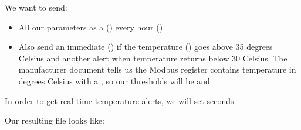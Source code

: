 \documentclass[letterpaper,10pt,english]{sphinxmanual}
\begin{document}
We want to send:
\begin{itemize}
\item {} 
All our parameters as a  () every hour ()

\item {} 
Also send an immediate  () if the temperature () goes above 35 degrees Celsius and another alert when temperature returns below 30 Celsius.
The manufacturer document tells us the Modbus register contains temperature in degrees Celsius with a , so our thresholds will be  and 

\end{itemize}

In order to get real-time temperature alerts, we will set  seconds.

\label{\detokenize{usage:example-config-dat}}
Our resulting  file looks like:
\end{document}
